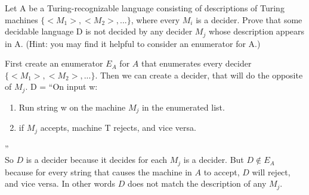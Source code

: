 \begin{problem}{5}
  Let A be a Turing-recognizable language consisting of descriptions of Turing machines $\{<M_1>, <M_2>,...\}$, where
  every $M_i$ is a decider. Prove that some decidable language D is not decided by any decider $M_j$ whose description
  appears in A. (Hint: you may find it helpful to consider an enumerator for A.)
  \begin{solution}
    First create an enumerator $E_A$ for $A$ that enumerates every decider $\{<M_1>, <M_2>,...\}$.
    \br
    Then we can create a decider, that will do the opposite of $M_j$.
    D = ``On input w:
    \begin{enumerate}
      \item Run string w on the machine $M_j$ in the enumerated list.\\
      \item if $M_j$ accepts, machine T rejects, and vice versa.\\
    \end{enumerate}
    ''\\ So $D$ is a decider because it decides for each $M_j$ is a decider.  But $D \notin E_A$ because for every
    string that causes the machine in $A$ to accept, $D$ will reject, and vice versa. In other words $D$ does not match
    the description of any $M_j$.
  \end{solution}
\end{problem}

